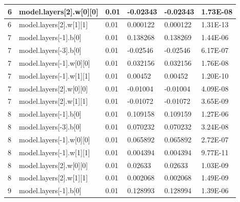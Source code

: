 \documentclass{article} %
\begin{document}
\begin{table}[]
\begin{tabular}{|l|l|l|l|l|l|}
6              & model.layers{[}2{]}.w{[}0{]}{[}0{]}  & 0.01             & -0.02343          & -0.02343        & 1.73E-08       \\ \hline
6              & model.layers{[}2{]}.w{[}1{]}{[}1{]}  & 0.01             & 0.000122          & 0.000122        & 1.31E-13       \\ \hline
7              & model.layers{[}-1{]}.b{[}0{]}        & 0.01             & 0.138268          & 0.138269        & 1.44E-06       \\ \hline
7              & model.layers{[}-3{]}.b{[}0{]}        & 0.01             & -0.02546          & -0.02546        & 6.17E-07       \\ \hline
7              & model.layers{[}-1{]}.w{[}0{]}{[}0{]} & 0.01             & 0.032156          & 0.032156        & 1.76E-08       \\ \hline
7              & model.layers{[}-1{]}.w{[}1{]}{[}1{]} & 0.01             & 0.00452           & 0.00452         & 1.20E-10       \\ \hline
7              & model.layers{[}2{]}.w{[}0{]}{[}0{]}  & 0.01             & -0.01004          & -0.01004        & 4.09E-08       \\ \hline
7              & model.layers{[}2{]}.w{[}1{]}{[}1{]}  & 0.01             & -0.01072          & -0.01072        & 3.65E-09       \\ \hline
8              & model.layers{[}-1{]}.b{[}0{]}        & 0.01             & 0.109158          & 0.109159        & 1.27E-06       \\ \hline
8              & model.layers{[}-3{]}.b{[}0{]}        & 0.01             & 0.070232          & 0.070232        & 3.24E-08       \\ \hline
8              & model.layers{[}-1{]}.w{[}0{]}{[}0{]} & 0.01             & 0.065892          & 0.065892        & 2.72E-07       \\ \hline
8              & model.layers{[}-1{]}.w{[}1{]}{[}1{]} & 0.01             & 0.004394          & 0.004394        & 9.77E-11       \\ \hline
8              & model.layers{[}2{]}.w{[}0{]}{[}0{]}  & 0.01             & 0.02633           & 0.02633         & 1.03E-09       \\ \hline
8              & model.layers{[}2{]}.w{[}1{]}{[}1{]}  & 0.01             & 0.002068          & 0.002068        & 1.49E-09       \\ \hline
9              & model.layers{[}-1{]}.b{[}0{]}        & 0.01             & 0.128993          & 0.128994        & 1.39E-06       \\ \hline

\end{tabular}
\end{table}
\end{document}
